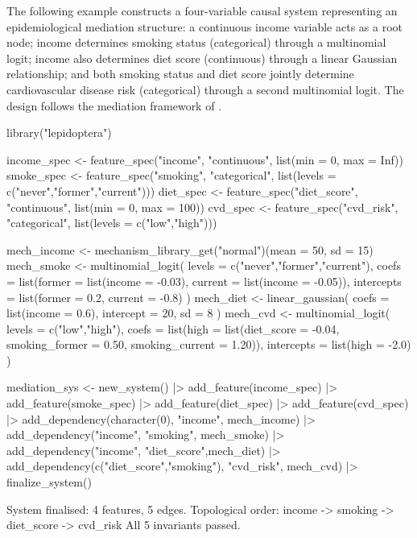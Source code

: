 \documentclass[article]{jss}
\begin{document}
The following example constructs a four-variable causal system representing an
epidemiological mediation structure: a continuous income variable acts as a root
node; income determines smoking status (categorical) through a multinomial logit;
income also determines diet score (continuous) through a linear Gaussian
relationship; and both smoking status and diet score jointly determine
cardiovascular disease risk (categorical) through a second multinomial logit. The
design follows the mediation framework of \citet{vanderweele2015explanation}.

\begin{CodeInput}
library("lepidoptera")

income_spec  <- feature_spec("income",     "continuous",
                             list(min = 0, max = Inf))
smoke_spec   <- feature_spec("smoking",    "categorical",
                             list(levels = c("never","former","current")))
diet_spec    <- feature_spec("diet_score", "continuous",
                             list(min = 0, max = 100))
cvd_spec     <- feature_spec("cvd_risk",   "categorical",
                             list(levels = c("low","high")))

mech_income <- mechanism_library_get("normal")(mean = 50, sd = 15)
mech_smoke  <- multinomial_logit(
  levels     = c("never","former","current"),
  coefs      = list(former  = list(income = -0.03),
                    current = list(income = -0.05)),
  intercepts = list(former  =  0.2, current = -0.8)
)
mech_diet   <- linear_gaussian(
  coefs = list(income = 0.6), intercept = 20, sd = 8
)
mech_cvd    <- multinomial_logit(
  levels     = c("low","high"),
  coefs      = list(high = list(diet_score      = -0.04,
                                smoking_former  =  0.50,
                                smoking_current =  1.20)),
  intercepts = list(high = -2.0)
)

mediation_sys <- new_system()                                      |>
  add_feature(income_spec) |> add_feature(smoke_spec)             |>
  add_feature(diet_spec)   |> add_feature(cvd_spec)               |>
  add_dependency(character(0), "income",    mech_income)          |>
  add_dependency("income",     "smoking",   mech_smoke)           |>
  add_dependency("income",     "diet_score",mech_diet)            |>
  add_dependency(c("diet_score","smoking"), "cvd_risk", mech_cvd) |>
  finalize_system()
\end{CodeInput}

\begin{CodeOutput}
System finalised: 4 features, 5 edges.
Topological order: income -> smoking -> diet_score -> cvd_risk
All 5 invariants passed.
\end{CodeOutput}
\end{document}
